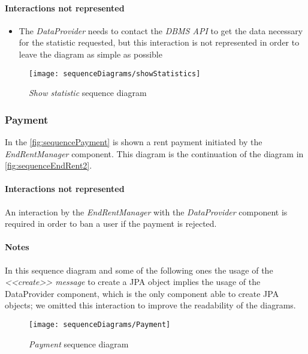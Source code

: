 \paragraph{Interactions not represented}
\begin{itemize}
	\item The \emph{DataProvider} needs to contact the \emph{DBMS API} to get the data necessary for the statistic requested,
		but this interaction is not represented in order to leave the diagram as simple as possible
\end{itemize}

\begin{figure}[h!]
	\centering
	\texttt{[image: sequenceDiagrams/showStatistics]}
	\caption{
		\label{fig:showStatistics} 
		\emph{Show statistic} sequence diagram
	}
\end{figure}

\clearpage
\subsubsection{Payment}
In the \autoref{fig:sequencePayment} is shown a rent payment initiated by the \emph{EndRentManager} component. This diagram is the continuation of the diagram in \autoref{fig:sequenceEndRent2}.

\paragraph{Interactions not represented} An interaction by the \emph{EndRentManager} with the \emph{DataProvider} component is required in order to ban a user if the payment is rejected.

\paragraph{Notes}
In this sequence diagram and some of the following ones the usage of the \emph{<<create>> message} to create a JPA object implies the usage of the DataProvider component, which is the only component able to create JPA objects; we omitted this interaction to improve the readability of the diagrams.

\begin{figure}[h!]
	\centering
	\texttt{[image: sequenceDiagrams/Payment]}
	\caption{
		\label{fig:sequencePayment} 
		\emph{Payment} sequence diagram
	}
\end{figure}

\clearpage
